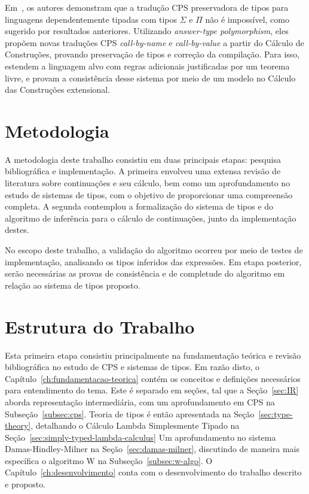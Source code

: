 Em~\cite{bowman2018cps}, os autores demonstram que a tradução CPS preservadora de tipos para linguagens dependentemente tipadas com tipos $\Sigma$ e $\Pi$ não é impossível, como sugerido por resultados anteriores.
Utilizando \textit{answer-type polymorphism}, eles propõem novas traduções CPS \textit{call-by-name} e \textit{call-by-value} a partir do Cálculo de Construções, provando preservação de tipos e correção da compilação.
Para isso, estendem a linguagem alvo com regras adicionais justificadas por um teorema livre, e provam a consistência desse sistema por meio de um modelo no Cálculo das Construções extensional.

\section{Metodologia}\label{sec:metodologia}

A metodologia deste trabalho consistiu em duas principais etapas: pesquisa bibliográfica e implementação.
A primeira envolveu uma extensa revisão de literatura sobre continuações e seu cálculo, bem como um aprofundamento no estudo de sistemas de tipos, com o objetivo de proporcionar uma compreensão completa.
A segunda contemplou a formalização do sistema de tipos e do algoritmo de inferência para o cálculo de continuações, junto da implementação destes.

No escopo deste trabalho, a validação do algoritmo ocorreu por meio de testes de implementação, analisando os tipos inferidos das expressões.
Em etapa posterior, serão necessárias as provas de consistência e de completude do algoritmo em relação ao sistema de tipos proposto.

\section{Estrutura do Trabalho}\label{sec:estrutura-trabalho}

Esta primeira etapa consistiu principalmente na fundamentação teórica e revisão bibliográfica no estudo de CPS e sistemas de tipos.
Em razão disto, o Capítulo~\ref{ch:fundamentacao-teorica} contém os conceitos e definições necessários para entendimento do tema.
Este é separado em seções, tal que a Seção~\ref{sec:IR} aborda representação intermediária, com um aprofundamento em CPS na Subseção~\ref{subsec:cps}.
Teoria de tipos é então apresentada na Seção~\ref{sec:type-theory}, detalhando o Cálculo Lambda Simplesmente Tipado na Seção~\ref{sec:simply-typed-lambda-calculus}
Um aprofundamento no sistema Damas-Hindley-Milner na Seção~\ref{sec:damas-milner}, discutindo de maneira mais específica o algoritmo W na Subseção~\ref{subsec:w-algo}.
O Capítulo~\ref{ch:desenvolvimento} conta com o desenvolvimento do trabalho descrito e proposto.
